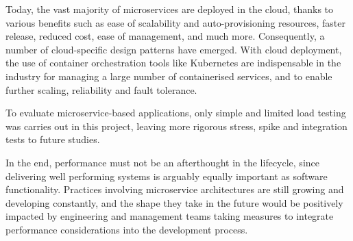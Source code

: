 Today, the vast majority of microservices are deployed in the cloud, thanks to various benefits such as ease of scalability and auto-provisioning resources, faster release, reduced cost, ease of management, and much more. Consequently, a number of cloud-specific design patterns have emerged. With cloud deployment, the use of container orchestration tools like Kubernetes are indispensable in the industry for managing a large number of containerised services, and to enable further scaling, reliability and fault tolerance.

To evaluate microservice-based applications, only simple and limited load testing was carries out in this project, leaving more rigorous stress, spike and integration tests to future studies.

In the end, performance must not be an afterthought in the lifecycle, since delivering well performing systems is arguably equally important as software functionality. Practices involving microservice architectures are still growing and developing constantly, and the shape they take in the future would be positively impacted by engineering and management teams taking measures to integrate performance considerations into the development process.
